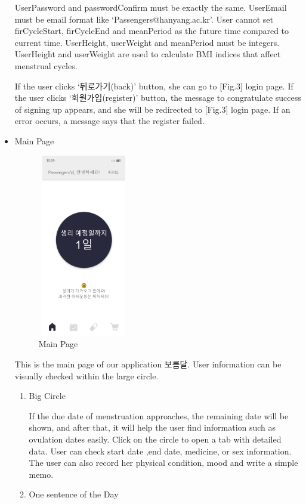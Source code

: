 \documentclass[conference]{IEEEtran}
\begin{document}
\begin{itemize}
    UserPassword and passwordConfirm must be exactly the same. UserEmail must be email format like ‘Passengers@hanyang.ac.kr’. User cannot set firCycleStart, firCycleEnd and meanPeriod as the future time compared to current time. UserHeight, userWeight and meanPeriod must be integers. UserHeight and userWeight are used to calculate BMI indices that affect menstrual cycles. 
    
    If the user clicks ‘뒤로가기(back)’ button, she can go to [Fig.3] login page. If the user clicks ‘회원가입(register)’ button, the message to congratulate success of signing up appears, and she will be redirected to [Fig.3] login page. If an error occurs, a message says that the register failed.

    \item Main Page
    \begin{figure}[htbp]
    \includegraphics[width=4cm, height=8cm, center]{Main.png}
    \caption{Main Page}
    \label{fig : Main Page}
    \end{figure}
    
    This is the main page of our application 보름달. User information can be visually checked within the large circle.
    \begin{enumerate}
    \setlength{\parindent}{2ex}
        \item Big Circle
        
        If the due date of menstruation approaches, the remaining date will be shown, and after that, it will help the user find information such as ovulation dates easily.
        Click on the circle to open a tab with detailed data. User can check start date ,end date, medicine, or sex information. The user can also record her physical condition, mood and write a simple memo.
        \item One sentence of the Day
        

\end{enumerate}
\end{itemize}
\end{document}
